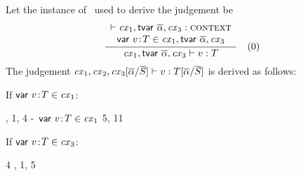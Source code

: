 \begin{bycase}
\Case{\Revar}\\
Let the instance of \Revar\ used to derive the judgement be
\[
\frac{\begin{array}{c}\vdash\mathit{cx}_1,\mathsf{tvar}\ \overline{\alpha},\mathit{cx}_3:\textsc{context}\\\mathsf{var}\ v\!:\!T\in\mathit{cx}_1,\mathsf{tvar}\ \overline{\alpha},\mathit{cx}_3\end{array}}{\mathit{cx}_1,\mathsf{tvar}\ \overline{\alpha},\mathit{cx}_3\vdash v:T}\quad\mbox{(0)}
\]
The judgement
$\mathit{cx}_1,\mathit{cx}_2,\mathit{cx}_3[\overline{\alpha}/\overline{S}]\vdash v:T[\overline{\alpha}/\overline{S}]$
is derived as follows:
\begin{derivation}
\end{derivation}
If $\mathsf{var}\ v\!:\!T\in\mathit{cx}_1$:
\begin{derivatioN}{3}
     {\Revar, 1, 4}
     {\hyp\ $\mathsf{var}\ v\!:\!T\in\mathit{cx}_1$}
     {5, 11}
\end{derivatioN}
If $\mathsf{var}\ v\!:\!T\in\mathit{cx}_3$:
\begin{derivatioN}{3}
     {4}
     {\Revar, 1, 5}
\end{derivatioN}


\end{bycase}
